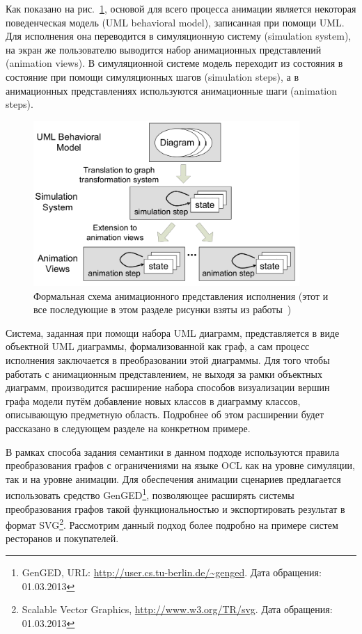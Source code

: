 \documentclass[a5paper]{article}
\begin{document}
Как показано на рис.~\ref{fig2}, основой для всего процесса анимации является некоторая поведенческая модель (UML behavioral model), записанная при помощи UML. Для исполнения она переводится в симуляционную систему (simulation system), на экран же пользователю выводится набор анимационных представлений (animation views). В симуляционной системе модель переходит из состояния в состояние при помощи симуляционных шагов (simulation steps), а в анимационных представлениях используются анимационные шаги (animation steps).

\begin{figure} [ht]
  \begin{center}
    \includegraphics[width=0.9\textwidth]{2.png}
    \caption{Формальная схема анимационного представления исполнения (этот и все последующие в этом разделе рисунки взяты из работы~\cite{genged3})}
    \label{fig2}
  \end{center}
\end{figure}

Система, заданная при помощи набора UML диаграмм, представляется в виде объектной UML диаграммы, формализованной как граф, а сам процесс исполнения заключается в преобразовании этой диаграммы. Для того чтобы работать с анимационным представлением, не выходя за рамки объектных диаграмм, производится расширение набора способов визуализации вершин графа модели путём добавление новых классов в диаграмму классов, описывающую предметную область. Подробнее об этом расширении будет рассказано в следующем разделе на конкретном примере.

В рамках способа задания семантики в данном подходе используются правила преобразования графов с ограничениями на языке OCL как на уровне симуляции, так и на уровне анимации. Для обеспечения анимации сценариев предлагается использовать средство GenGED\footnote{GenGED, URL: \url{http://user.cs.tu-berlin.de/~genged}. Дата обращения: 01.03.2013}, позволяющее расширять системы преобразования графов такой функциональностью и экспортировать результат в формат SVG\footnote{Scalable Vector Graphics, \url{http://www.w3.org/TR/svg}. Дата обращения: 01.03.2013}. Рассмотрим данный подход более подробно на примере систем ресторанов и покупателей.
\end{document}
